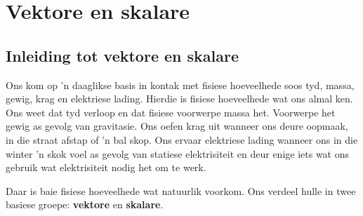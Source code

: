          \chapter{Vektore en skalare}\label{chap:vectors}
    \setcounter{figure}{1}
    \setcounter{subfigure}{1}
    \label{59e414b70efc194a27a122db47d06ce6}
         \section{Inleiding tot vektore en skalare}
    \nopagebreak
Ons kom op  'n daaglikse basis in kontak met fisiese hoeveelhede soos tyd, massa, gewig, krag en elektriese lading. Hierdie is fisiese hoeveelhede wat ons almal ken. Ons weet dat tyd verloop en dat fisiese voorwerpe massa het. Voorwerpe het gewig as gevolg van gravitasie. Ons oefen krag uit wanneer ons deure oopmaak, in die straat afstap of  'n bal skop. Ons ervaar elektriese lading wanneer ons in die winter  'n skok voel as gevolg van statiese elektrisiteit en deur enige iets wat ons gebruik wat elektrisiteit nodig het om te werk.

Daar is baie fisiese hoeveelhede wat natuurlik voorkom. Ons verdeel hulle in twee basiese groepe: \textbf{vektore} en \textbf{skalare}.\\

